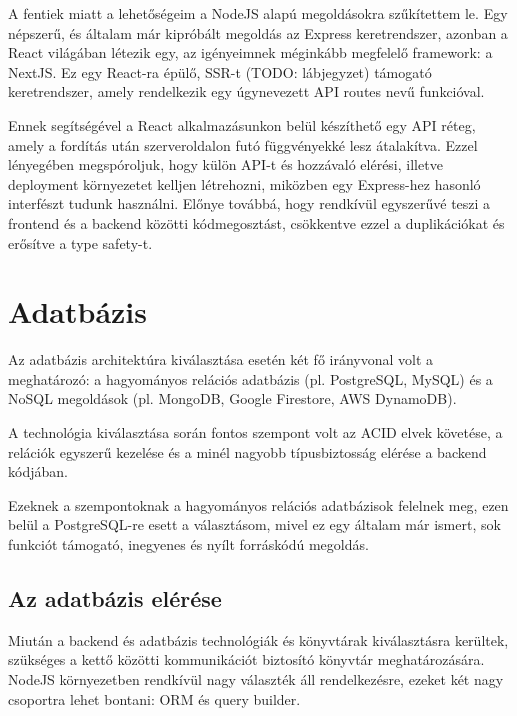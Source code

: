 A fentiek miatt a lehetőségeim a NodeJS alapú megoldásokra szűkítettem le. Egy népszerű, és általam már kipróbált megoldás az Express keretrendszer, azonban a React világában létezik egy, az igényeimnek méginkább megfelelő framework: a NextJS.
Ez egy React-ra épülő, SSR-t (TODO: lábjegyzet) támogató keretrendszer, amely rendelkezik egy úgynevezett API routes nevű funkcióval.

Ennek segítségével a React alkalmazásunkon belül készíthető egy API réteg, amely a fordítás után szerveroldalon futó függvényekké lesz átalakítva.
Ezzel lényegében megspóroljuk, hogy külön API-t és hozzávaló elérési, illetve deployment környezetet kelljen létrehozni, miközben egy Express-hez hasonló interfészt tudunk használni.
Előnye továbbá, hogy rendkívül egyszerűvé teszi a frontend és a backend közötti kódmegosztást, csökkentve ezzel a duplikációkat és erősítve a type safety-t.

\section{Adatbázis}
Az adatbázis architektúra kiválasztása esetén két fő irányvonal volt a meghatározó: a hagyományos relációs adatbázis (pl. PostgreSQL, MySQL) és a NoSQL megoldások (pl. MongoDB, Google Firestore, AWS DynamoDB).

A technológia kiválasztása során fontos szempont volt az ACID elvek követése, a relációk egyszerű kezelése és a minél nagyobb típusbiztosság elérése a backend kódjában.

Ezeknek a szempontoknak a hagyományos relációs adatbázisok felelnek meg, ezen belül a PostgreSQL-re esett a választásom, mivel ez egy általam már ismert, sok funkciót támogató, inegyenes és nyílt forráskódú megoldás.

\subsection{Az adatbázis elérése}
Miután a backend és adatbázis technológiák és könyvtárak kiválasztásra kerültek, szükséges a kettő közötti kommunikációt biztosító könyvtár meghatározására.
NodeJS környezetben rendkívül nagy választék áll rendelkezésre, ezeket két nagy csoportra lehet bontani: ORM és query builder.

